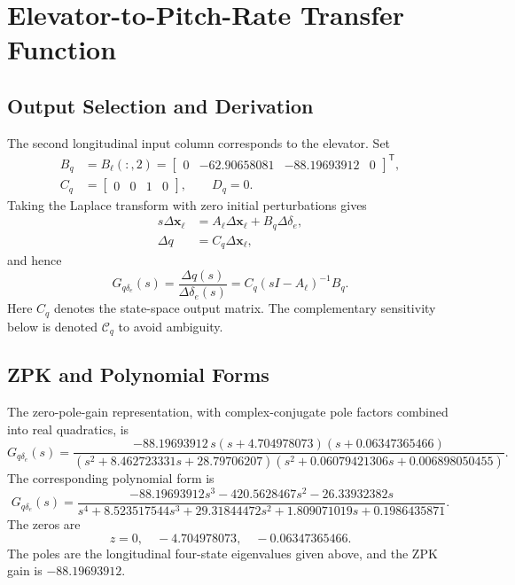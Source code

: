 \documentclass[a4paper,11pt]{article}
\newcommand{\de}{\delta_e}
\newcommand{\Gq}{G_{q\delta_e}}
\begin{document}
\section{Elevator-to-Pitch-Rate Transfer Function}
\subsection{Output Selection and Derivation}
The second longitudinal input column corresponds to the elevator. Set
\begin{equation}
\begin{aligned}
B_q&=B_\ell(:,2)=\begin{bmatrix}0&-62.90658081&-88.19693912&0\end{bmatrix}^{\mathsf T},\\
C_q&=\begin{bmatrix}0&0&1&0\end{bmatrix},\qquad D_q=0.
\end{aligned}
\end{equation}
Taking the Laplace transform with zero initial perturbations gives
\begin{align}
s\Delta\bm x_\ell&=A_\ell\Delta\bm x_\ell+B_q\Delta\de,\\
\Delta q&=C_q\Delta\bm x_\ell,
\end{align}
and hence
\begin{equation}\label{eq:gdefinition}
\boxed{\Gq(s)=\frac{\Delta q(s)}{\Delta\de(s)}=C_q(sI-A_\ell)^{-1}B_q.}
\end{equation}
Here $C_q$ denotes the state-space output matrix. The complementary sensitivity below is denoted $\mathcal C_q$ to avoid ambiguity.

\subsection{ZPK and Polynomial Forms}
The zero-pole-gain representation, with complex-conjugate pole factors combined into real quadratics, is
\begin{equation}\label{eq:gfactored}
\boxed{\Gq(s)=\frac{-88.19693912\,s(s+4.704978073)(s+0.06347365466)}
{(s^2+8.462723331s+28.79706207)(s^2+0.06079421306s+0.006898050455)}.}
\end{equation}
The corresponding polynomial form is
\begin{equation}
\Gq(s)=\frac{-88.19693912s^3-420.5628467s^2-26.33932382s}
{s^4+8.523517544s^3+29.31844472s^2+1.809071019s+0.1986435871}.
\end{equation}
The zeros are
\begin{equation}
z=0,\quad -4.704978073,\quad -0.06347365466.
\end{equation}
The poles are the longitudinal four-state eigenvalues given above, and the ZPK gain is $-88.19693912$.
\end{document}
